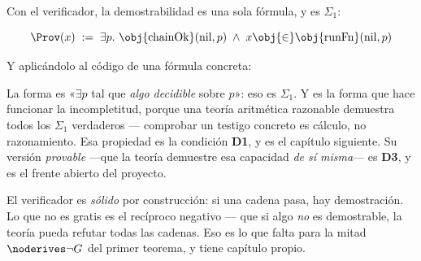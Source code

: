 Con el verificador, la demostrabilidad es una sola fórmula, y es \(\Sigma_1\):


\begin{matematica}
\[
  \Prov(x) \;:=\; \exists p.\ \obj{\mathrm{chainOk}}(\mathrm{nil}, p)
  \;\wedge\; x \obj{\in} \obj{\mathrm{runFn}}(\mathrm{nil}, p)
\]
\end{matematica}

Y aplicándolo al código de una fórmula concreta:


\begin{leccion}
La forma es «\(\exists p\) tal que \emph{algo decidible} sobre \(p\)»: eso es
\(\Sigma_1\). Y es la forma que hace funcionar la incompletitud, porque una teoría aritmética
razonable demuestra todos los \(\Sigma_1\) verdaderos — comprobar un testigo concreto es cálculo,
no razonamiento. Esa propiedad es la condición \textbf{D1}, y es el capítulo siguiente. Su versión
\emph{provable} —que la teoría demuestre esa capacidad \emph{de sí misma}— es \textbf{D3}, y es el
frente abierto del proyecto.
\end{leccion}

\begin{muro}
El verificador es \emph{sólido} por construcción: si una cadena pasa, hay demostración. Lo que no es
gratis es el recíproco negativo — que si algo \emph{no} es demostrable, la teoría pueda refutar
todas las cadenas. Eso es lo que falta para la mitad $\noderives\lnot G$ del primer teorema, y tiene
capítulo propio.
\end{muro}
